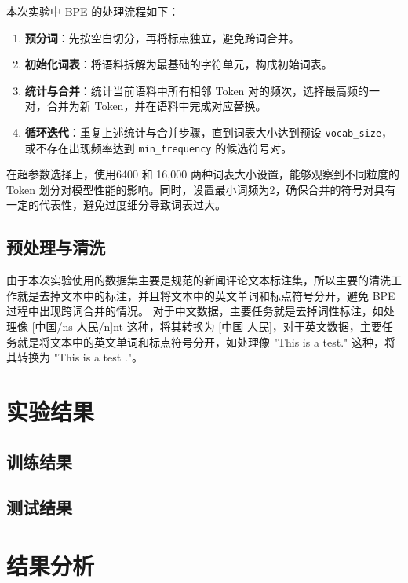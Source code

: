 \documentclass[a4paper,12pt]{ctexart} %
\begin{document}
本次实验中 BPE 的处理流程如下：
\begin{enumerate}
    \item \textbf{预分词}：先按空白切分，再将标点独立，避免跨词合并。
    \item \textbf{初始化词表}：将语料拆解为最基础的字符单元，构成初始词表。
    \item \textbf{统计与合并}：统计当前语料中所有相邻 Token 对的频次，选择最高频的一对，合并为新 Token，并在语料中完成对应替换。
    \item \textbf{循环迭代}：重复上述统计与合并步骤，直到词表大小达到预设 \texttt{vocab\_size}，或不存在出现频率达到 \texttt{min\_frequency} 的候选符号对。
\end{enumerate}
在超参数选择上，使用6400 和 16,000 两种词表大小设置，能够观察到不同粒度的 Token 划分对模型性能的影响。同时，设置最小词频为2，确保合并的符号对具有一定的代表性，避免过度细分导致词表过大。
\subsection{预处理与清洗}
由于本次实验使用的数据集主要是规范的新闻评论文本标注集，所以主要的清洗工作就是去掉文本中的标注，并且将文本中的英文单词和标点符号分开，避免 BPE 过程中出现跨词合并的情况。
对于中文数据，主要任务就是去掉词性标注，如处理像 [中国/ns 人民/n]nt 这种，将其转换为 [中国 人民]，对于英文数据，主要任务就是将文本中的英文单词和标点符号分开，如处理像 "This is a test." 这种，将其转换为 "This is a test ."。

\section{实验结果}


\subsection{训练结果}


\subsection{测试结果}


\section{结果分析}
\end{document}
